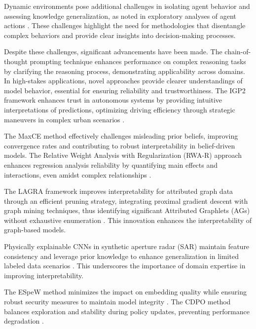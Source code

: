 Dynamic environments pose additional challenges in isolating agent behavior and assessing knowledge generalization, as noted in exploratory analyses of agent actions \cite{jucys2024interpretabilityactionexploratoryanalysis}. These challenges highlight the need for methodologies that disentangle complex behaviors and provide clear insights into decision-making processes.

Despite these challenges, significant advancements have been made. The chain-of-thought prompting technique enhances performance on complex reasoning tasks by clarifying the reasoning process, demonstrating applicability across domains. In high-stakes applications, novel approaches provide clearer understandings of model behavior, essential for ensuring reliability and trustworthiness. The IGP2 framework enhances trust in autonomous systems by providing intuitive interpretations of predictions, optimizing driving efficiency through strategic maneuvers in complex urban scenarios \cite{albrecht2021interpretablegoalbasedpredictionplanning}.

The MaxCE method effectively challenges misleading prior beliefs, improving convergence rates and contributing to robust interpretability in belief-driven models. The Relative Weight Analysis with Regularization (RWA-R) approach enhances regression analysis reliability by quantifying main effects and interactions, even amidst complex relationships \cite{sols2021usingrelativeweightanalysis}.

The LAGRA framework improves interpretability for attributed graph data through an efficient pruning strategy, integrating proximal gradient descent with graph mining techniques, thus identifying significant Attributed Graphlets (AGs) without exhaustive enumeration \cite{shinji2024learningattributedgraphletspredictive}. This innovation enhances the interpretability of graph-based models.

Physically explainable CNNs in synthetic aperture radar (SAR) maintain feature consistency and leverage prior knowledge to enhance generalization in limited labeled data scenarios \cite{huang2022physicallyexplainablecnnsar}. This underscores the importance of domain expertise in improving interpretability.

The ESpeW method minimizes the impact on embedding quality while ensuring robust security measures to maintain model integrity \cite{wang2024espewrobustcopyrightprotection}. The CDPO method balances exploration and stability during policy updates, preventing performance degradation \cite{zhang2022conservativedualpolicyoptimization}. 

